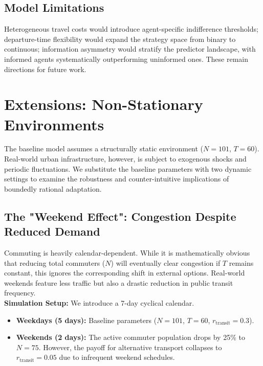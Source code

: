 \documentclass[letterpaper]{article}
\begin{document}
\subsection{Model Limitations}

Heterogeneous travel costs would introduce agent-specific indifference thresholds; departure-time flexibility would expand the strategy space from binary to continuous; information asymmetry would stratify the predictor landscape, with informed agents systematically outperforming uninformed ones. These remain directions for future work. \\

\section{Extensions: Non-Stationary Environments}

The baseline model assumes a structurally static environment ($N=101$, $T=60$). Real-world urban infrastructure, however, is subject to exogenous shocks and periodic fluctuations. We substitute the baseline parameters with two dynamic settings to examine the robustness and counter-intuitive implications of boundedly rational adaptation. \\

\subsection{The "Weekend Effect": Congestion Despite Reduced Demand}

Commuting is heavily calendar-dependent. While it is mathematically obvious that reducing total commuters ($N$) will eventually clear congestion if $T$ remains constant, this ignores the corresponding shift in external options. Real-world weekends feature less traffic but also a drastic reduction in public transit frequency. \\

\textbf{Simulation Setup:} We introduce a 7-day cyclical calendar. \\
\begin{itemize}
    \item \textbf{Weekdays (5 days):} Baseline parameters ($N=101$, $T=60$, $r_{\text{transit}} = 0.3$).
    \item \textbf{Weekends (2 days):} The active commuter population drops by 25\% to $N=75$. However, the payoff for alternative transport collapses to $r_{\text{transit}} = 0.05$ due to infrequent weekend schedules.
\end{itemize}
\end{document}
